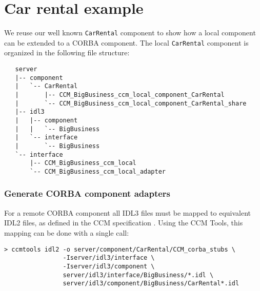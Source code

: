 
\section{Car rental example}

We reuse our well known {\tt CarRental} component
to show how a local component can be extended to a CORBA component.
The local {\tt CarRental} component is organized in the following file 
structure:

\begin{small}
\begin{verbatim}
   server
   |-- component
   |   `-- CarRental
   |       |-- CCM_BigBusiness_ccm_local_component_CarRental
   |       `-- CCM_BigBusiness_ccm_local_component_CarRental_share
   |-- idl3
   |   |-- component
   |   |   `-- BigBusiness
   |   `-- interface
   |       `-- BigBusiness
   `-- interface
       |-- CCM_BigBusiness_ccm_local
       `-- CCM_BigBusiness_ccm_local_adapter
\end{verbatim}
\end{small}


\subsubsection{Generate CORBA component adapters}

For a remote CORBA component all IDL3 files must be mapped to equivalent
IDL2 files, as defined in the CCM specification \cite{CCMSpecification}.
Using the CCM Tools, this mapping can be done with a single call: 
\begin{small}
\begin{verbatim}
> ccmtools idl2 -o server/component/CarRental/CCM_corba_stubs \ 
                -Iserver/idl3/interface \
                -Iserver/idl3/component \
                server/idl3/interface/BigBusiness/*.idl \
                server/idl3/component/BigBusiness/CarRental*.idl
\end{verbatim}
\end{small}

